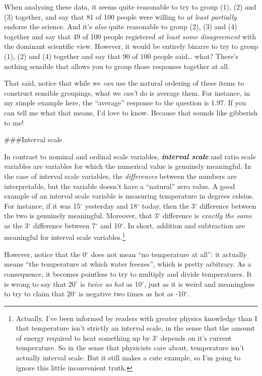 \documentclass[]{book}
\begin{document}
When analysing these data, it seems quite reasonable to try to group (1), (2) and (3) together, and say that 81 of 100 people were willing to \emph{at least partially} endorse the science. And it's \emph{also} quite reasonable to group (2), (3) and (4) together and say that 49 of 100 people registered \emph{at least some disagreement} with the dominant scientific view. However, it would be entirely bizarre to try to group (1), (2) and (4) together and say that 90 of 100 people said\ldots{} what? There's nothing sensible that allows you to group those responses together at all.

That said, notice that while we \emph{can} use the natural ordering of these items to construct sensible groupings, what we \emph{can't} do is average them. For instance, in my simple example here, the ``average'' response to the question is 1.97. If you can tell me what that means, I'd love to know. Because that sounds like gibberish to me!

\#\#\#Interval scale

In contrast to nominal and ordinal scale variables, \textbf{\emph{interval scale}} and ratio scale variables are variables for which the numerical value is genuinely meaningful. In the case of interval scale variables, the \emph{differences} between the numbers are interpretable, but the variable doesn't have a ``natural'' zero value. A good example of an interval scale variable is measuring temperature in degrees celsius. For instance, if it was 15\(^\circ\) yesterday and 18\(^\circ\) today, then the 3\(^\circ\) difference between the two is genuinely meaningful. Moreover, that 3\(^\circ\) difference is \emph{exactly the same} as the 3\(^\circ\) difference between 7\(^\circ\) and 10\(^\circ\). In short, addition and subtraction are meaningful for interval scale variables.\footnote{Actually, I've been informed by readers with greater physics knowledge than I that temperature isn't strictly an interval scale, in the sense that the amount of energy required to heat something up by 3\(^\circ\) depends on it's current temperature. So in the sense that physicists care about, temperature isn't actually interval scale. But it still makes a cute example, so I'm going to ignore this little inconvenient truth.}

However, notice that the 0\(^\circ\) does not mean ``no temperature at all'': it actually means ``the temperature at which water freezes'', which is pretty arbitrary. As a consequence, it becomes pointless to try to multiply and divide temperatures. It is wrong to say that \(20^\circ\) is \emph{twice as hot} as 10\(^\circ\), just as it is weird and meaningless to try to claim that 20\(^\circ\) is negative two times as hot as -10\(^\circ\).
\end{document}
